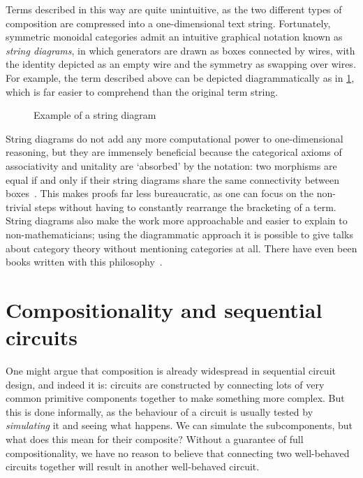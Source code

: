 Terms described in this way are quite unintuitive, as the two different types of
composition are compressed into a one-dimensional text string.
Fortunately, symmetric monoidal categories admit an intuitive graphical notation
known as \emph{string diagrams}, in which generators are
drawn as boxes connected by wires, with the identity depicted as an empty wire
and the symmetry as swapping over wires.
For example, the term described above can be depicted diagrammatically as in
\cref{fig:string}, which is far easier to comprehend than the original term
string.

\begin{figure}
    \centering
    \caption{Example of a string diagram}
    \label{fig:string}
\end{figure}

String diagrams do not add any more computational power to one-dimensional
reasoning, but they are
immensely beneficial because the categorical axioms of associativity and
unitality are `absorbed' by the notation: two morphisms are equal if and only if
their string diagrams share the same connectivity between
boxes~\cite{kelly1980coherence,kissinger2014abstract,selinger2011survey}.
This makes proofs far less bureaucratic, as one can focus on the non-trivial
steps without having to constantly rearrange the bracketing of a term.
String diagrams also make the work more approachable and easier to explain to
non-mathematicians; using the diagrammatic approach it is possible to give talks
about category theory without mentioning categories at all.
There have even been books written with this
philosophy~\cite{coecke2018picturing}.


\section{Compositionality and sequential circuits}

One might argue that composition is already widespread in sequential circuit
design, and indeed it is: circuits are constructed by connecting lots of very
common primitive components together to make something more complex.
But this is done informally, as the behaviour of a circuit is usually tested
by \emph{simulating} it and seeing what happens.
We can simulate the subcomponents, but what does this mean for their composite?
Without a guarantee of full compositionality, we have no reason to
believe that connecting two well-behaved circuits together will result in
another well-behaved circuit.

